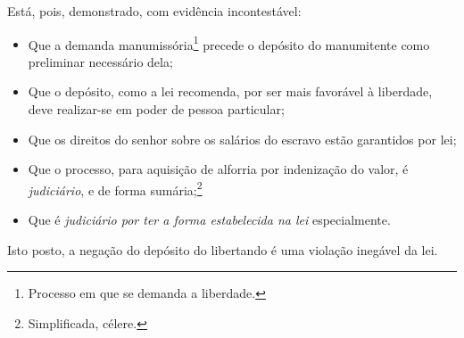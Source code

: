 {Está, pois, demonstrado, com evidência incontestável:

\begin{itemize}
\item Que a demanda
manumissória\footnote{Processo em que se demanda a liberdade.} precede
o depósito do manumitente como preliminar necessário dela;

\item Que o depósito, como a lei recomenda, por ser mais favorável à
liberdade, deve realizar-se em poder de pessoa particular;

\item Que os direitos do senhor sobre os salários do escravo estão garantidos
por lei;

\item Que o processo, para aquisição de alforria por indenização do valor, é
\emph{judiciário}, e de forma sumária;\footnote{Simplificada, célere.}

\item Que é \emph{judiciário por ter a forma estabelecida na lei}
especialmente.

\end{itemize}
Isto posto, a negação do depósito do libertando é uma violação inegável da lei.

}
